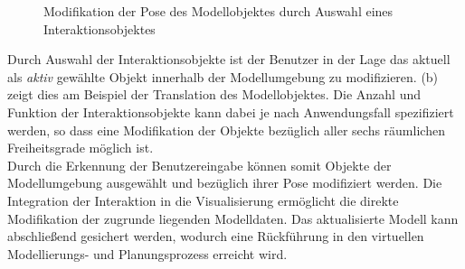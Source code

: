 \begin{figure}[!ht]
	\begin{center}
	\hspace{5mm}
	\caption{Modifikation der Pose des Modellobjektes durch Auswahl eines Interaktionsobjektes}
	\label{fig.intarrows}
	\end{center}
\end{figure}

Durch Auswahl der Interaktionsobjekte ist der Benutzer in der Lage das aktuell als \textit{aktiv} gewählte Objekt innerhalb der Modellumgebung zu modifizieren.  (b) zeigt dies am Beispiel der Translation des Modellobjektes. Die Anzahl und Funktion der Interaktionsobjekte kann dabei je nach Anwendungsfall spezifiziert werden, so dass eine Modifikation der Objekte bezüglich aller sechs räumlichen Freiheitsgrade möglich ist.\\

Durch die Erkennung der Benutzereingabe können somit Objekte der Modellumgebung ausgewählt und bezüglich ihrer Pose modifiziert werden. Die Integration der Interaktion in die Visualisierung ermöglicht die direkte Modifikation der zugrunde liegenden Modelldaten. Das aktualisierte Modell kann abschließend gesichert werden, wodurch eine Rückführung in den virtuellen Modellierungs- und Planungsprozess erreicht wird.

\prever{
}